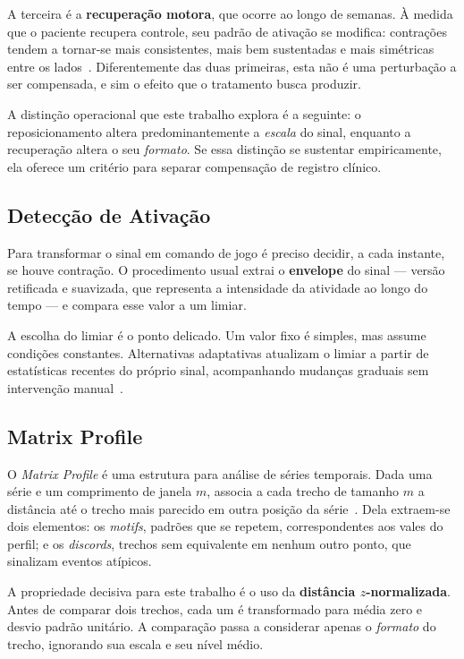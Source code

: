 A terceira é a \textbf{recuperação motora}, que ocorre ao longo de
semanas. À medida que o paciente recupera controle, seu padrão de
ativação se modifica: contrações tendem a tornar-se mais consistentes,
mais bem sustentadas e mais simétricas entre os
lados~\cite{ref:recuperacao_motora_semg}. Diferentemente das duas
primeiras, esta não é uma perturbação a ser compensada, e sim o efeito
que o tratamento busca produzir.

A distinção operacional que este trabalho explora é a seguinte: o
reposicionamento altera predominantemente a \textit{escala} do sinal,
enquanto a recuperação altera o seu \textit{formato}. Se essa distinção
se sustentar empiricamente, ela oferece um critério para separar
compensação de registro clínico.

\subsection{Detecção de Ativação}

Para transformar o sinal em comando de jogo é preciso decidir, a cada
instante, se houve contração. O procedimento usual extrai o
\textbf{envelope} do sinal --- versão retificada e suavizada, que
representa a intensidade da atividade ao longo do tempo --- e compara
esse valor a um limiar.

A escolha do limiar é o ponto delicado. Um valor fixo é simples, mas
assume condições constantes. Alternativas adaptativas atualizam o
limiar a partir de estatísticas recentes do próprio sinal,
acompanhando mudanças graduais sem intervenção
manual~\cite{ref:limiar_adaptativo}.

\subsection{Matrix Profile}

O \textit{Matrix Profile} é uma estrutura para análise de séries
temporais. Dada uma série e um comprimento de janela $m$, associa a
cada trecho de tamanho $m$ a distância até o trecho mais parecido em
outra posição da série~\cite{ref:matrix_profile_base}. Dela extraem-se
dois elementos: os \textit{motifs}, padrões que se repetem,
correspondentes aos vales do perfil; e os \textit{discords}, trechos
sem equivalente em nenhum outro ponto, que sinalizam eventos atípicos.

A propriedade decisiva para este trabalho é o uso da \textbf{distância
$z$-normalizada}. Antes de comparar dois trechos, cada um é
transformado para média zero e desvio padrão unitário. A comparação
passa a considerar apenas o \textit{formato} do trecho, ignorando sua
escala e seu nível médio.

